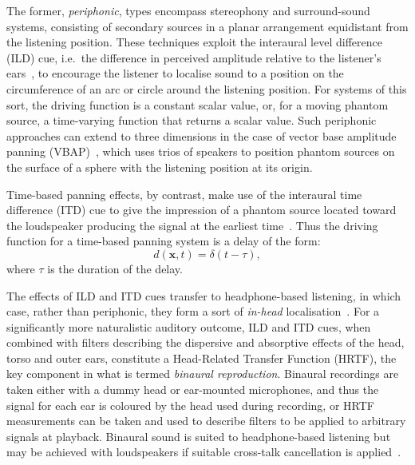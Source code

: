 The former, \textit{periphonic}, types encompass stereophony and surround-sound
systems, consisting of secondary sources in a planar arrangement equidistant
from the listening position.
These techniques exploit the interaural level difference (ILD) cue, i.e.\ the
difference in perceived amplitude relative to the listener's
ears~\citep{pulkki_virtual_1997,verheijen_sound_1998,ziemer_wave_2020}, to
encourage the listener to localise sound to a position on the circumference of
an arc or circle around the listening position.
For systems of this sort, the driving function is a constant scalar value, or,
for a moving phantom source, a time-varying function that returns a scalar
value.
Such periphonic approaches can extend to three dimensions in the case of
vector base amplitude panning (VBAP)~\citep{pulkki_virtual_1997}, which uses
trios of speakers to position phantom sources on the surface of a sphere
with the listening position at its origin.

Time-based panning effects, by contrast, make use of the interaural time
difference (ITD) cue to give the impression of a phantom source located toward
the loudspeaker producing the signal at the earliest
time~\citep{pulkki_virtual_1997,verheijen_sound_1998}.
Thus the driving function for a time-based panning system is a delay of the
form:
\begin{equation}
    d(\mathbf{x},t) = \delta(t - \tau),
    \label{eq:time-driving-function}
\end{equation}
where $\tau$ is the duration of the delay.

The effects of ILD and ITD cues transfer to headphone-based listening, in which
case, rather than periphonic, they form a sort of \textit{in-head}
localisation~\citep{ahrens_analytic_2012}.
For a significantly more naturalistic auditory outcome, ILD and ITD cues, when
combined with filters describing the dispersive and absorptive effects of the
head, torso and outer ears, constitute a Head-Related Transfer Function (HRTF),
the key component in what is termed \textit{binaural reproduction}.
Binaural recordings are taken either with a dummy head or ear-mounted
microphones, and thus the signal for each ear is coloured by the head used
during recording, or HRTF measurements can be taken and used to describe filters
to be applied to arbitrary signals at playback.
Binaural sound is suited to headphone-based listening but may be achieved with
loudspeakers if suitable cross-talk cancellation is
applied~\citep{kaiser_transaural_2011}.

